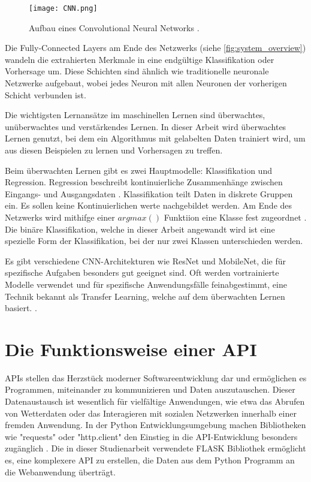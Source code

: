 \begin{figure}[h]
    \centering
    \texttt{[image: CNN.png]}
    \caption{Aufbau eines Convolutional Neural Networks \cite{finbridgede_computer_2022}.}
    \label{fig:system_overview}
\end{figure}

Die Fully-Connected Layers am Ende des Netzwerks (siehe \autoref{fig:system_overview}) wandeln die extrahierten Merkmale in eine endgültige Klassifikation oder Vorhersage um. Diese Schichten sind ähnlich wie traditionelle neuronale Netzwerke aufgebaut, wobei jedes Neuron mit allen Neuronen der vorherigen Schicht verbunden ist.

Die wichtigsten Lernansätze im maschinellen Lernen sind überwachtes, unüberwachtes und verstärkendes Lernen. In dieser Arbeit wird überwachtes Lernen genutzt, bei dem ein Algorithmus mit gelabelten Daten trainiert wird, um aus diesen Beispielen zu lernen und Vorhersagen zu treffen.

Beim überwachten Lernen gibt es zwei Hauptmodelle: Klassifikation und Regression. Regression beschreibt kontinuierliche Zusammenhänge zwischen Eingangs- und Ausgangsdaten \cite{noauthor_machine_nodate-1}. Klassifikation teilt Daten in diskrete Gruppen ein. Es sollen keine Kontinuierlichen werte nachgebildet werden. Am Ende des Netzwerks wird mithifge einer $argmax()$ Funktiion eine Klasse fest zugeordnet \cite[S. 450]{suse_bildverarbeitung_2014}. Die binäre Klassifikation, welche in dieser Arbeit angewandt wird ist eine spezielle Form der Klassifikation, bei der nur zwei Klassen unterschieden werden.

Es gibt verschiedene CNN-Architekturen wie ResNet und MobileNet, die für spezifische Aufgaben besonders gut geeignet sind. Oft werden vortrainierte Modelle verwendet und für spezifische Anwendungsfälle feinabgestimmt, eine Technik bekannt als Transfer Learning, welche auf dem überwachten Lernen basiert. \cite{finbridgede_computer_2022}.

\section{Die Funktionsweise einer API} \label{sec:api}  %

APIs stellen das Herzstück moderner Softwareentwicklung dar und ermöglichen es Programmen, miteinander zu kommunizieren und Daten auszutauschen. Dieser Datenaustausch ist wesentlich für vielfältige Anwendungen, wie etwa das Abrufen von Wetterdaten oder das Interagieren mit sozialen Netzwerken innerhalb einer fremden Anwendung. In der Python Entwicklungsumgebung machen Bibliotheken wie "requests" oder "http.client" den Einstieg in die API-Entwicklung besonders zugänglich \cite{software_mittelstand_erste_nodate}. Die in dieser Studienarbeit verwendete FLASK Bibliothek ermöglicht es, eine komplexere API zu erstellen, die Daten aus dem Python Programm an die Webanwendung überträgt.

